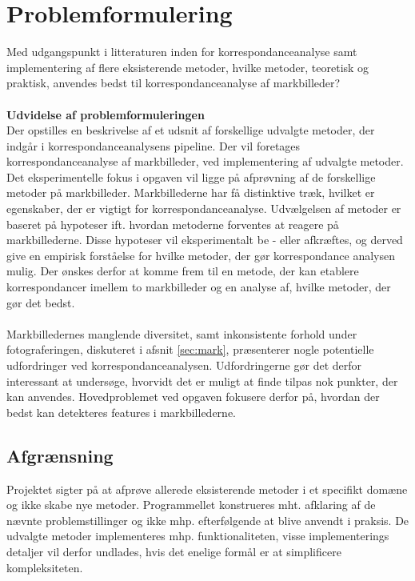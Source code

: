 \section{Problemformulering} \label{subsec:form}
Med udgangspunkt i litteraturen inden for
korrespondanceanalyse samt implementering af
flere eksisterende metoder, hvilke metoder, teoretisk og praktisk, anvendes bedst til korrespondanceanalyse af markbilleder? \\ \\
\textbf{Udvidelse af problemformuleringen} \\
Der opstilles en beskrivelse af et udsnit af forskellige udvalgte metoder, der indgår i korrespondanceanalysens pipeline. Der vil foretages korrespondanceanalyse af markbilleder, ved implementering af udvalgte metoder. \\
Det eksperimentelle fokus i opgaven vil ligge på afprøvning af de forskellige metoder på markbilleder. Markbillederne har få distinktive træk, hvilket er egenskaber, der er vigtigt for korrespondanceanalyse. Udvælgelsen af metoder er baseret på hypoteser ift. hvordan metoderne forventes at reagere på markbillederne. Disse hypoteser vil eksperimentalt be - eller afkræftes, og derved give en empirisk forståelse for hvilke metoder, der gør korrespondance analysen mulig. Der ønskes derfor at komme frem til en metode, der kan etablere korrespondancer imellem to markbilleder og en analyse af, hvilke metoder, der gør det bedst.
\\ \\
Markbilledernes manglende diversitet, samt inkonsistente forhold under fotograferingen, diskuteret i afsnit \ref{sec:mark}, præsenterer nogle potentielle udfordringer ved korrespondanceanalysen. Udfordringerne gør det derfor interessant at undersøge, hvorvidt det er muligt at finde tilpas nok punkter, der kan anvendes. Hovedproblemet ved opgaven fokusere derfor på, hvordan der bedst kan detekteres features i markbillederne.
\subsection{Afgrænsning} \label{subsec:afg}
Projektet sigter på at afprøve allerede eksisterende metoder i et specifikt domæne og ikke
skabe nye metoder. Programmellet konstrueres mht. afklaring af de nævnte problemstillinger
og ikke mhp. efterfølgende at blive anvendt i praksis. De udvalgte metoder implementeres mhp. funktionaliteten, visse implementerings detaljer vil derfor undlades, hvis det enelige formål er at simplificere kompleksiteten.